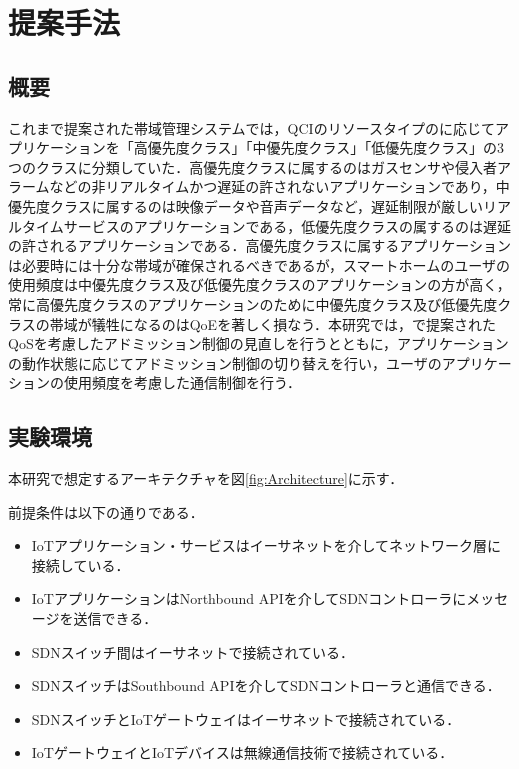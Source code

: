 \documentclass[a4paper,10pt,twocolumn,uplatex]{jsarticle}
\begin{document}
\section{提案手法}

\subsection{概要}
これまで提案された帯域管理システムでは，QCIのリソースタイプのに応じてアプリケーションを「高優先度クラス」「中優先度クラス」「低優先度クラス」の3つのクラスに分類していた．高優先度クラスに属するのはガスセンサや侵入者アラームなどの非リアルタイムかつ遅延の許されないアプリケーションであり，中優先度クラスに属するのは映像データや音声データなど，遅延制限が厳しいリアルタイムサービスのアプリケーションである，低優先度クラスの属するのは遅延の許されるアプリケーションである．高優先度クラスに属するアプリケーションは必要時には十分な帯域が確保されるべきであるが，スマートホームのユーザの使用頻度は中優先度クラス及び低優先度クラスのアプリケーションの方が高く，常に高優先度クラスのアプリケーションのために中優先度クラス及び低優先度クラスの帯域が犠牲になるのはQoEを著しく損なう．本研究では，\cite{AQRA}で提案されたQoSを考慮したアドミッション制御の見直しを行うとともに，アプリケーションの動作状態に応じてアドミッション制御の切り替えを行い，ユーザのアプリケーションの使用頻度を考慮した通信制御を行う．

\subsection{実験環境}
本研究で想定するアーキテクチャを図\ref{fig:Architecture}に示す．\par
前提条件は以下の通りである．\par

\begin{itemize}
  \item IoTアプリケーション・サービスはイーサネットを介してネットワーク層に接続している．
  \item IoTアプリケーションはNorthbound APIを介してSDNコントローラにメッセージを送信できる．
  \item SDNスイッチ間はイーサネットで接続されている．
  \item SDNスイッチはSouthbound APIを介してSDNコントローラと通信できる．
  \item SDNスイッチとIoTゲートウェイはイーサネットで接続されている．
  \item IoTゲートウェイとIoTデバイスは無線通信技術で接続されている．
\end{itemize}
\end{document}
